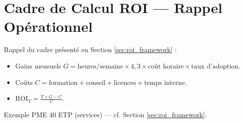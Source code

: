 \section{Cadre de Calcul ROI — Rappel Opérationnel}
Rappel du cadre présenté en Section \ref{sec:roi_framework} :
\begin{itemize}
    \item Gains mensuels \(G = \text{heures/semaine} \times 4{,}3 \times \text{coût horaire} \times \text{taux d'adoption}\).
    \item Coûts \(C = \text{formation} + \text{conseil} + \text{licences} + \text{temps interne}\).
    \item \(\text{ROI}_T = \frac{T \times G - C}{C}\).
\end{itemize}
Exemple PME 40 ETP (services) — cf. Section \ref{sec:roi_framework}.
